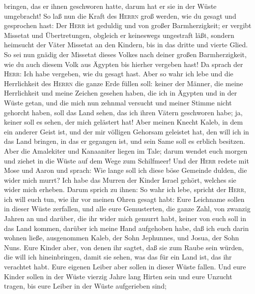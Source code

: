 bringen, das er ihnen geschworen hatte, darum hat er sie in der Wüste
umgebracht!  So laß nun die Kraft des \textsc{Herrn} groß
werden, wie du gesagt und gesprochen hast:  Der
\textsc{Herr} ist geduldig und von großer Barmherzigkeit; er vergibt
Missetat und Übertretungen, obgleich er keineswegs ungestraft läßt,
sondern heimsucht der Väter Missetat an den Kindern, bis in das dritte
und vierte Glied.  So sei nun gnädig der Missetat dieses
Volkes nach deiner großen Barmherzigkeit, wie du auch diesem Volk aus
Ägypten bis hierher vergeben hast!  Da sprach der
\textsc{Herr}: Ich habe vergeben, wie du gesagt hast. 
Aber so wahr ich lebe und die Herrlichkeit des \textsc{Herrn} die ganze
Erde füllen soll:  keiner der Männer, die meine
Herrlichkeit und meine Zeichen gesehen haben, die ich in Ägypten und in
der Wüste getan, und die mich nun zehnmal versucht und meiner Stimme
nicht gehorcht haben,  soll das Land sehen, das ich ihren
Vätern geschworen habe; ja, keiner soll es sehen, der mich gelästert
hat!  Aber meinen Knecht Kaleb, in dem ein anderer Geist
ist, und der mir völligen Gehorsam geleistet hat, den will ich in das
Land bringen, in das er gegangen ist, und sein Same soll es erblich
besitzen.  Aber die Amalekiter und Kanaaniter liegen im
Tale; darum wendet euch morgen und ziehet in die Wüste auf dem Wege zum
Schilfmeer!  Und der \textsc{Herr} redete mit Mose und
Aaron und sprach:  Wie lange soll ich diese böse Gemeinde
dulden, die wider mich murrt? Ich habe das Murren der Kinder Israel
gehört, welches sie wider mich erheben.  Darum sprich zu
ihnen: So wahr ich lebe, spricht der \textsc{Herr}, ich will euch tun,
wie ihr vor meinen Ohren gesagt habt:  Eure Leichname
sollen in dieser Wüste zerfallen, und alle eure Gemusterten, die ganze
Zahl, von zwanzig Jahren an und darüber, die ihr wider mich gemurrt
habt,  keiner von euch soll in das Land kommen, darüber
ich meine Hand aufgehoben habe, daß ich euch darin wohnen ließe,
ausgenommen Kaleb, der Sohn Jephunnes, und Josua, der Sohn Nuns.
 Eure Kinder aber, von denen ihr sagtet, daß sie zum
Raube sein würden, die will ich hineinbringen, damit sie sehen, was das
für ein Land ist, das ihr verachtet habt.  Eure eigenen
Leiber aber sollen in dieser Wüste fallen.  Und eure
Kinder sollen in der Wüste vierzig Jahre lang Hirten sein und eure
Unzucht tragen, bis eure Leiber in der Wüste aufgerieben sind;
